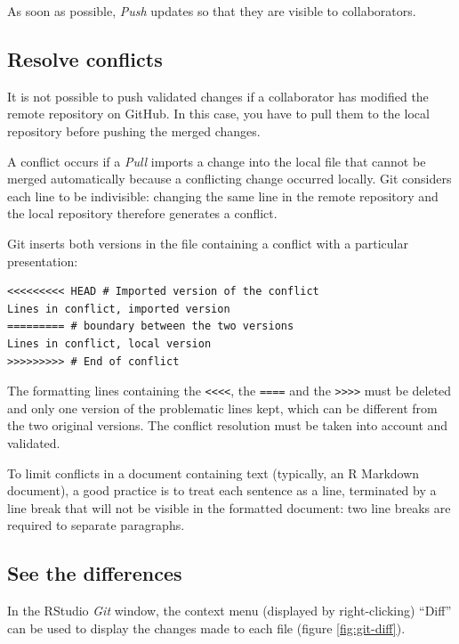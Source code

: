 \documentclass[
  12pt,
  american,
  a4paper,
  extrafontsizes,onecolumn,openright
  ]{memoir}
\begin{document}
As soon as possible, \emph{Push} updates so that they are visible to collaborators.

\subsection{Resolve conflicts}\label{resolve-conflicts}

It is not possible to push validated changes if a collaborator has modified the remote repository on GitHub.
In this case, you have to pull them to the local repository before pushing the merged changes.

A conflict occurs if a \emph{Pull} imports a change into the local file that cannot be merged automatically because a conflicting change occurred locally.
Git considers each line to be indivisible: changing the same line in the remote repository and the local repository therefore generates a conflict.

Git inserts both versions in the file containing a conflict with a particular presentation:

\begin{verbatim}
<<<<<<<<< HEAD # Imported version of the conflict
Lines in conflict, imported version
========= # boundary between the two versions
Lines in conflict, local version
>>>>>>>>> # End of conflict
\end{verbatim}

The formatting lines containing the \texttt{\textless{}\textless{}\textless{}\textless{}}, the \texttt{====} and the \texttt{\textgreater{}\textgreater{}\textgreater{}\textgreater{}} must be deleted and only one version of the problematic lines kept, which can be different from the two original versions.
The conflict resolution must be taken into account and validated.

To limit conflicts in a document containing text (typically, an R Markdown document), a good practice is to treat each sentence as a line, terminated by a line break that will not be visible in the formatted document: two line breaks are required to separate paragraphs.

\subsection{See the differences}\label{see-the-differences}

In the RStudio \emph{Git} window, the context menu (displayed by right-clicking) \enquote{Diff} can be used to display the changes made to each file (figure \ref{fig:git-diff}).
\end{document}
